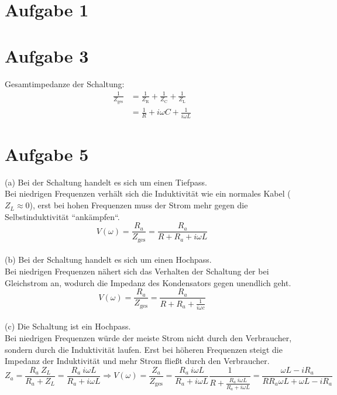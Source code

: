 \documentclass[11pt a4paper]{article}
\begin{document}
\thispagestyle{fancy}
\section{Aufgabe 1}

\newpage
\setlength{\headheight}{0cm}

\section*{Aufgabe 3}

Gesamtimpedanze der Schaltung:
\begin{align*}
	\frac1{Z_\text{ges}}
	&= \frac1{Z_\text{R}} + \frac1{Z_\text{C}} + \frac1{Z_\text{L}} \\
	&= \frac1R + i\omega C + \frac1{i\omega L}
\end{align*}

\newpage

\section*{Aufgabe 5}

\quad (a) Bei der Schaltung handelt es sich um einen Tiefpass. \\
Bei niedrigen Frequenzen verhält sich die Induktivität 
wie ein normales Kabel ($Z_L \approx 0$), erst bei hohen Frequenzen muss der Strom mehr gegen die 
Selbstinduktivität ``ankämpfen``.
\[ V(\omega) = \frac{R_a}{Z_\text{ges}} = \frac{R_a}{R + R_a + i\omega L} \]
\\

(b) Bei der Schaltung handelt es sich um einen Hochpass. \\
Bei niedrigen Frequenzen nähert sich das Verhalten der
Schaltung der bei Gleichstrom an, wodurch die Impedanz des Kondensators gegen unendlich geht.
\[ V(\omega) = \frac{R_a}{Z_\text{ges}} = \frac{R_a}{R + R_a + \frac{1}{i\omega c}} \]
\\

(c) Die Schaltung ist ein Hochpass. \\
Bei niedrigen Frequenzen würde der meiste Strom nicht durch den Verbraucher, sondern durch die Induktivität laufen.
Erst bei höheren Frequenzen steigt die Impedanz der Induktivität und mehr Strom fließt durch den Verbraucher.
\[
	Z_a = \frac{R_a \ Z_L}{R_a + Z_L} = \frac{R_a \ i\omega L}{R_a + i\omega L} 
	\Rightarrow 
	V(\omega) = \frac{Z_a}{Z_\text{ges}} 
	= \frac{R_a \ i\omega L}{R_a + i\omega L} \frac{1}{R + \frac{R_a \ i\omega L}{R_a + i\omega L}}
	= \frac{\omega L - iR_a}{R R_a \omega L + \omega L - iR_a}
\]
\\
\end{document}

